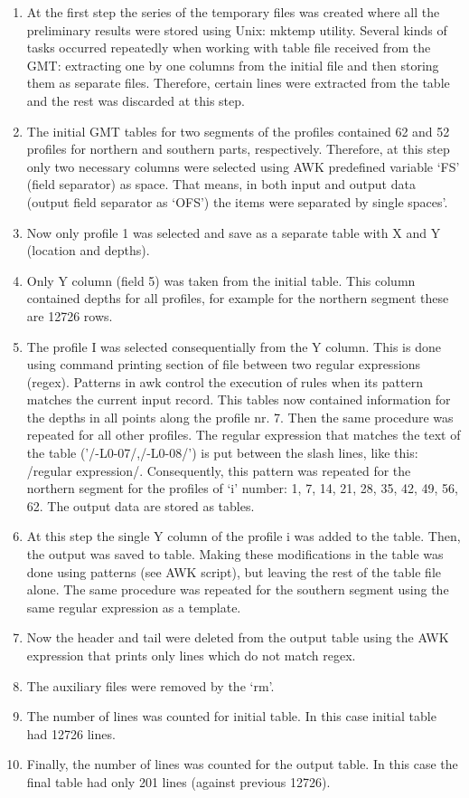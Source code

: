 \documentclass[11pt,a4paper]{report}
\begin{document}
{\begin{enumerate}
	\item At the first step the series of the temporary files was created where all the preliminary results were stored using Unix: mktemp utility. Several kinds of tasks occurred repeatedly when working with table file received from the \ac{GMT}: extracting one by one columns from the initial file and then storing them as separate files. Therefore,  certain lines were extracted from the table and the rest was discarded at this step.
	\item The initial \ac{GMT} tables for two segments of the profiles contained 62 and 52 profiles for northern and southern parts, respectively. Therefore, at this step only two necessary columns were selected using AWK predefined variable ‘FS’ (field separator) as space. That means, in both input and output data (output field separator as ‘OFS’) the items were separated by single spaces’.
	\item Now only profile 1 was selected and save as a separate table with X and Y (location and depths). 
	\item Only Y column (field 5) was taken from the initial table. This column contained depths for all profiles, for example for the northern segment these are 12726 rows.
	\item The profile I was selected consequentially from the Y column. This is done using command printing section of file between two regular expressions (regex). Patterns in awk control the execution of rules when its pattern matches the current input record. This tables now contained information for the depths in all points along the profile nr. 7. Then the same procedure was repeated for all other profiles. The regular expression that matches the text of the table ('/-L0-07/,/-L0-08/') is put between the slash lines, like this: /regular expression/. Consequently, this pattern was repeated for the northern segment for the profiles of ‘i’ number: 1, 7, 14, 21, 28, 35, 42, 49, 56, 62. The output data are stored as tables. 
	\item At this step the single Y column of the profile i was added to the table. Then, the output was saved to table. Making these modifications in the table was done using patterns (see AWK script), but leaving the rest of the table file alone. The same procedure was repeated for the southern segment using the same regular expression as a template. 
	\item Now the header and tail were deleted from the output table using the AWK expression that prints only lines which do not match regex.
	\item The auxiliary files were removed by the ‘rm’.
	\item The number of lines was counted for initial table. In this case initial table had 12726 lines.
	\item Finally, the number of lines was counted for the output table. In this case the final table had only 201 lines (against previous 12726).
\end{enumerate}

}
\end{document}
